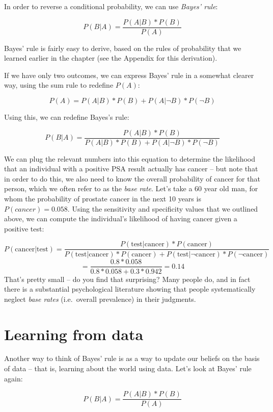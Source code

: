 \documentclass[12pt,]{book}
\theoremstyle{definition}
\theoremstyle{definition}
\theoremstyle{definition}
\theoremstyle{remark}
\begin{document}
In order to reverse a conditional probability, we can use \emph{Bayes' rule}:

\[
P(B|A) = \frac{P(A|B)*P(B)}{P(A)}
\]

Bayes' rule is fairly easy to derive, based on the rules of probability that we learned earlier in the chapter (see the Appendix for this derivation).

If we have only two outcomes, we can express Bayes' rule in a somewhat clearer way, using the sum rule to redefine \(P(A)\):

\[
P(A) = P(A|B)*P(B) + P(A|\neg B)*P(\neg B)
\]

Using this, we can redefine Bayes's rule:

\[
P(B|A) = \frac{P(A|B)*P(B)}{P(A|B)*P(B) + P(A|\neg B)*P(\neg B)}
\]

We can plug the relevant numbers into this equation to determine the likelihood that an individual with a positive PSA result actually has cancer -- but note that in order to do this, we also need to know the overall probability of cancer for that person, which we often refer to as the \emph{base rate}. Let's take a 60 year old man, for whom the probability of prostate cancer in the next 10 years is \(P(cancer)=0.058\). Using the sensitivity and specificity values that we outlined above, we can compute the individual's likelihood of having cancer given a positive test:

\[
P(\text{cancer|test}) = \frac{P(\text{test|cancer})*P(\text{cancer})}{P(\text{test|cancer})*P(\text{cancer}) + P(\text{test|}\neg\text{cancer})*P(\neg\text{cancer})} 
\]
\[
= \frac{0.8*0.058}{0.8*0.058 +0.3*0.942 } = 0.14
\]
That's pretty small -- do you find that surprising? Many people do, and in fact there is a substantial psychological literature showing that people systematically neglect \emph{base rates} (i.e.~overall prevalence) in their judgments.

\hypertarget{learning-from-data-1}{%
\section{Learning from data}\label{learning-from-data-1}}

Another way to think of Bayes' rule is as a way to update our beliefs on the basis of data -- that is, learning about the world using data. Let's look at Bayes' rule again:

\[
P(B|A) =  \frac{P(A|B)*P(B)}{P(A)}
\]
\end{document}
